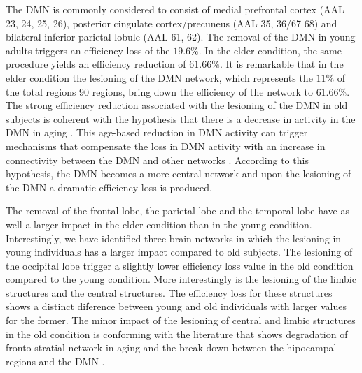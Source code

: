 \documentclass[12pt,a4paper]{article}
\begin{document}
The DMN is commonly considered to consist of medial prefrontal cortex
(AAL 23, 24, 25, 26), posterior cingulate cortex/precuneus (AAL 35, 36/67 68)
and bilateral inferior parietal lobule (AAL 61, 62). 
The removal of the DMN in
young adults triggers an efficiency loss of the $19.6\%$. In the elder condition, the same procedure yields an efficiency reduction of $61.66\%$. It is remarkable that in the elder condition the lesioning of the DMN network, which represents the $11\%$ of the total regions 90 regions, bring down the efficiency of the network to $61.66\%$.
The strong efficiency reduction associated with the lesioning of the DMN in old subjects is coherent with the hypothesis that there is a decrease in activity in the DMN in aging \cite{koch_effects_2010}. This age-based reduction in DMN activity can trigger mechanisms that compensate the loss in DMN activity with an increase in connectivity between the DMN and other networks \cite{damoiseaux_reduced_2008}. According to this hypothesis, the DMN becomes a more central network and upon the lesioning of the DMN a dramatic efficiency loss is produced. 


The removal of the frontal lobe, the parietal lobe and the temporal lobe have as well a larger impact in the elder condition than in the young condition. 
Interestingly, we have identified three brain networks in which the lesioning in young individuals has a larger impact compared to old subjects. The lesioning of the occipital lobe trigger a slightly lower efficiency loss value in the old condition compared to the young condition. More interestingly is the lesioning of the limbic structures and the central structures. The efficiency loss for these structures shows a distinct diference between young and old individuals with larger values for the former. The minor impact of the lesioning of central and limbic structures in the old condition is conforming with the literature that shows degradation of fronto-stratial network in aging \cite{salami_elevated_2014} and the break-down between the hipocampal regions and the DMN \cite{fjell_brain_2015}. 
\end{document}
